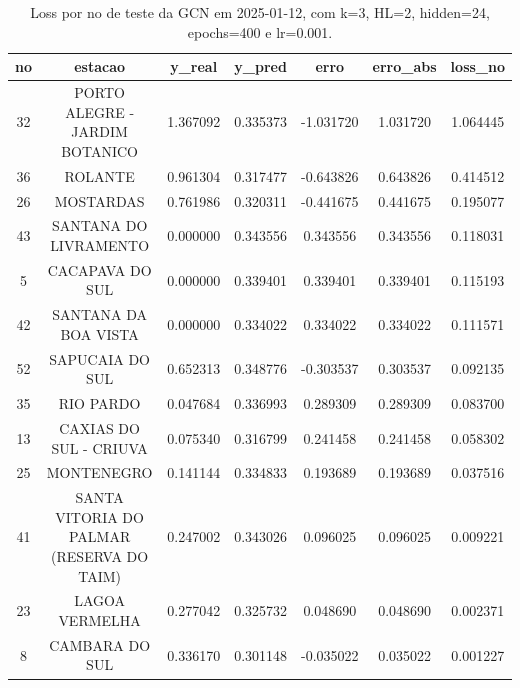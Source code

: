 \begin{table}[h]
\centering
\caption{Loss por no de teste da GCN em 2025-01-12, com k=3, HL=2, hidden=24, epochs=400 e lr=0.001.}
\label{tab:gcn_loss_k3_hl2_h24_e400_d20250112}
\begin{tabular}{ccccccc}
\toprule
no & estacao & y\_real & y\_pred & erro & erro\_abs & loss\_no \\
\midrule
32 & PORTO ALEGRE - JARDIM BOTANICO & 1.367092 & 0.335373 & -1.031720 & 1.031720 & 1.064445 \\
36 & ROLANTE & 0.961304 & 0.317477 & -0.643826 & 0.643826 & 0.414512 \\
26 & MOSTARDAS & 0.761986 & 0.320311 & -0.441675 & 0.441675 & 0.195077 \\
43 & SANTANA DO LIVRAMENTO & 0.000000 & 0.343556 & 0.343556 & 0.343556 & 0.118031 \\
5 & CACAPAVA DO SUL & 0.000000 & 0.339401 & 0.339401 & 0.339401 & 0.115193 \\
42 & SANTANA DA BOA VISTA & 0.000000 & 0.334022 & 0.334022 & 0.334022 & 0.111571 \\
52 & SAPUCAIA DO SUL & 0.652313 & 0.348776 & -0.303537 & 0.303537 & 0.092135 \\
35 & RIO PARDO & 0.047684 & 0.336993 & 0.289309 & 0.289309 & 0.083700 \\
13 & CAXIAS DO SUL - CRIUVA & 0.075340 & 0.316799 & 0.241458 & 0.241458 & 0.058302 \\
25 & MONTENEGRO & 0.141144 & 0.334833 & 0.193689 & 0.193689 & 0.037516 \\
41 & SANTA VITORIA DO PALMAR (RESERVA DO TAIM) & 0.247002 & 0.343026 & 0.096025 & 0.096025 & 0.009221 \\
23 & LAGOA VERMELHA & 0.277042 & 0.325732 & 0.048690 & 0.048690 & 0.002371 \\
8 & CAMBARA DO SUL & 0.336170 & 0.301148 & -0.035022 & 0.035022 & 0.001227 \\
\bottomrule
\end{tabular}
\end{table}
